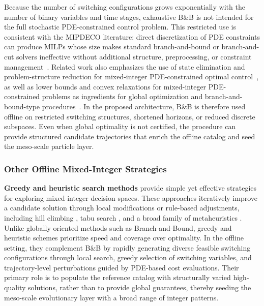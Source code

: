 \documentclass{article}
\newcommand{\1}{\mathds{1}}          %
\theoremstyle{definition}
\begin{document}
\begin{sloppypar}
Because the number of switching configurations grows exponentially with the number of
binary variables and time stages, exhaustive B\&B is not intended for the full stochastic
PDE-constrained control problem. This restricted use is consistent with the MIPDECO
literature: direct discretization of PDE constraints can produce MILPs whose size makes
standard branch-and-bound or branch-and-cut solvers ineffective without additional
structure, preprocessing, or constraint management~\cite{Gnegel2021}. Related work also
emphasizes the use of state elimination and problem-structure reduction for mixed-integer
PDE-constrained optimal control~\cite{Thuenen2022}, as well as lower bounds and convex
relaxations for mixed-integer PDE-constrained problems as ingredients for global optimization
and branch-and-bound-type procedures~\cite{Leyffer2025}. In the proposed architecture,
B\&B is therefore used offline on restricted switching structures, shortened horizons, or reduced discrete subspaces. Even when global optimality is not certified, the procedure can
provide structured candidate trajectories that enrich the offline catalog and seed the
meso-scale particle layer.



\subsubsection{Other Offline Mixed-Integer Strategies}

{\bf Greedy and heuristic search methods} provide simple yet effective strategies for exploring
mixed-integer decision spaces. These approaches iteratively improve a candidate solution
through local modifications \cite{JohnsonPapadimitriouYannakakis1988} or rule-based
adjustments, including hill climbing \cite{RussellNorvig2010}, tabu search
\cite{Glover1986,Glover1989,Glover1990}, and a broad family of metaheuristics
\cite{Talbi2009}. Unlike globally oriented methods such as Branch-and-Bound, greedy and
heuristic schemes prioritize speed and coverage over optimality. In the offline setting,
they complement B\&B by rapidly generating diverse feasible switching configurations through
local search, greedy selection of switching variables, and trajectory-level perturbations
guided by PDE-based cost evaluations. Their primary role is to populate the reference catalog
with structurally varied high-quality solutions, rather than to provide global guarantees,
thereby seeding the meso-scale evolutionary layer with a broad range of integer patterns.


\end{sloppypar}
\end{document}
